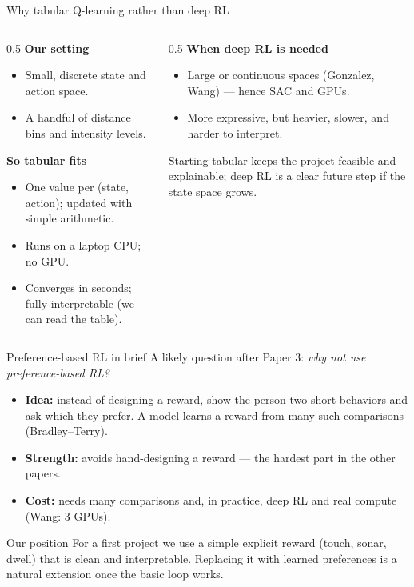 \documentclass[aspectratio=169,10pt]{beamer}
\begin{document}
\begin{frame}{Why tabular Q-learning rather than deep RL}
  \begin{columns}[T]
    \begin{column}{0.5\textwidth}
      \textbf{Our setting}
      \begin{itemize}\footnotesize
        \item Small, discrete state and action space.
        \item A handful of distance bins and intensity levels.
      \end{itemize}
      \textbf{So tabular fits}
      \begin{itemize}\footnotesize
        \item One value per (state, action); updated with simple arithmetic.
        \item Runs on a laptop CPU; no GPU.
        \item Converges in seconds; fully interpretable (we can read the table).
      \end{itemize}
    \end{column}
    \begin{column}{0.5\textwidth}
      \textbf{When deep RL is needed}
      \begin{itemize}\footnotesize
        \item Large or continuous spaces (Gonzalez, Wang) --- hence SAC and GPUs.
        \item More expressive, but heavier, slower, and harder to interpret.
      \end{itemize}
      \begin{block}{}
        \scriptsize Starting tabular keeps the project feasible and explainable; deep RL is a clear future step if the state space grows.
      \end{block}
    \end{column}
  \end{columns}
\end{frame}

\begin{frame}{Preference-based RL in brief}
  \footnotesize
  A likely question after Paper 3: \emph{why not use preference-based RL?}
  \begin{itemize}
    \item \textbf{Idea:} instead of designing a reward, show the person two short behaviors and ask which they prefer. A model learns a reward from many such comparisons (Bradley--Terry).
    \item \textbf{Strength:} avoids hand-designing a reward --- the hardest part in the other papers.
    \item \textbf{Cost:} needs many comparisons and, in practice, deep RL and real compute (Wang: 3 GPUs).
  \end{itemize}
  \begin{block}{Our position}
    \footnotesize For a first project we use a simple explicit reward (touch, sonar, dwell) that is clean and interpretable. Replacing it with learned preferences is a natural extension once the basic loop works.
  \end{block}
\end{frame}
\end{document}
